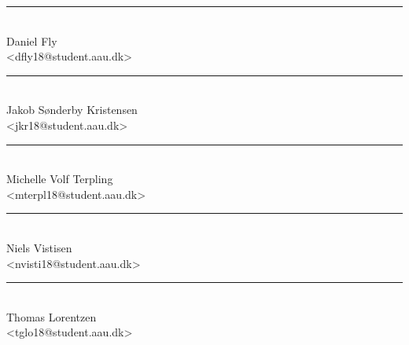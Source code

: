\vspace{1\baselineskip}
\begin{minipage}[b]{0.45\textwidth}
 \centering
 \rule{\textwidth}{0.5pt}\\
  Daniel Fly\\
 {\footnotesize <dfly18@student.aau.dk>}
\end{minipage}
\hfill
\begin{minipage}[b]{0.45\textwidth}
 \centering
 \rule{\textwidth}{0.5pt}\\
  Jakob Sønderby Kristensen\\
 {\footnotesize <jkr18@student.aau.dk>}
\end{minipage}

\vspace{1\baselineskip}
\begin{minipage}[b]{0.45\textwidth}
 \centering
 \rule{\textwidth}{0.5pt}\\
  Michelle Volf Terpling\\
 {\footnotesize <mterpl18@student.aau.dk>}
\end{minipage}
\hfill
\begin{minipage}[b]{0.45\textwidth}
 \centering
 \rule{\textwidth}{0.5pt}\\
  Niels Vistisen \\
 {\footnotesize <nvisti18@student.aau.dk>}
\end{minipage}

% 
\vspace{0.8\baselineskip}
\begin{center}
\begin{minipage}[b]{0.45\textwidth}
 \centering
 \rule{\textwidth}{0.5pt}\\
  Thomas Lorentzen\\
 {\footnotesize <tglo18@student.aau.dk>}
\end{minipage}
\end{center}